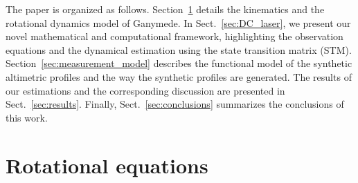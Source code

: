 \documentclass[lineno, pdflatex,sn-mathphys-ay]{sn-jnl}
\theoremstyle{thmstyleone}%
\theoremstyle{thmstyletwo}%
\theoremstyle{thmstylethree}%
\begin{document}




The paper is organized as follows. 
Section~\ref{sec:rotational_eqs_V2} details the kinematics and the rotational dynamics model of Ganymede. 
In Sect.~\ref{sec:DC_laser}, we present our novel mathematical and computational framework, highlighting the observation equations and the dynamical estimation using the state transition matrix (STM). 
Section~\ref{sec:measurement_model} describes the functional model of the synthetic altimetric profiles and the way the synthetic profiles are generated. The results of our estimations and the corresponding discussion are presented in 
Sect.~\ref{sec:results}. 
Finally, Sect.~\ref{sec:conclusions} summarizes the conclusions of this work.


\section{Rotational equations}\label{sec:rotational_eqs_V2}
\end{document}
